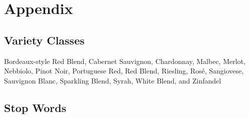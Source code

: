 \documentclass[12pt]{IEEEtran}
\begin{document}


\newpage
\section{Appendix}

\subsection{Variety Classes}
\label{variety_classes}
Bordeaux-style Red Blend, Cabernet Sauvignon, Chardonnay, Malbec, Merlot, Nebbiolo, Pinot Noir, Portuguese Red, Red Blend, Riesling, Rosé, Sangiovese, Sauvignon Blanc, Sparkling Blend, Syrah, White Blend, and Zinfandel

\subsection{Stop Words}
\end{document}
